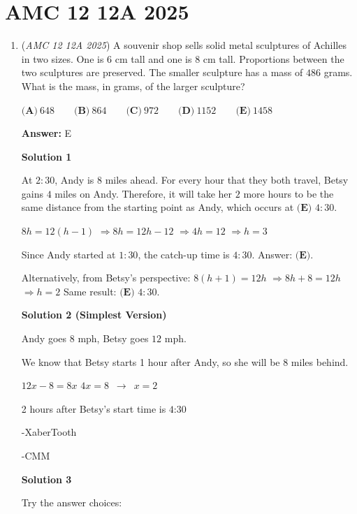 \section{AMC 12 12A 2025}
        \begin{enumerate}
        	\item (\textit{AMC 12 12A 2025}) A souvenir shop sells solid metal sculptures of Achilles in two sizes. One is $6$ cm tall and one is $8$ cm tall. Proportions between the two sculptures are preserved. The smaller sculpture has a mass of $486$ grams. What is the mass, in grams, of the larger sculpture?


 $\textbf{(A)}\   648  \qquad                 \textbf{(B)}\   864  \qquad                 \textbf{(C)}\   972  \qquad                 \textbf{(D)}\   1152  \qquad                 \textbf{(E)}\   1458$

 \textbf{Answer: }E



\textbf{Solution 1}

At $2{:}30$, Andy is $8$ miles ahead. For every hour that they both travel, Betsy gains $4$ miles on Andy. Therefore, it will take her $2$ more hours to be the same distance from the starting point as Andy, which occurs at $\boxed{\textbf{(E) } 4{:}30}$.

 $8h = 12(h-1)$ $\Rightarrow 8h = 12h - 12$ $\Rightarrow 4h = 12$ $\Rightarrow h = 3$

 Since Andy started at $1{:}30$, the catch-up time is $4{:}30$.  Answer: $\textbf{(E)}$.

 Alternatively, from Betsy's perspective:  $8(h+1) = 12h$ $\Rightarrow 8h + 8 = 12h$ $\Rightarrow h = 2$  Same result: $\textbf{(E) } 4{:}30$.

 



\textbf{Solution 2 (Simplest Version)}

Andy goes $8$ mph, Betsy goes $12$ mph.  

 We know that Betsy starts 1 hour after Andy, so she will be 8 miles behind.

 $12x - 8 = 8x$
$4x = 8$ $\,\rightarrow\,$ $x = 2$

 2 hours after Betsy's start time is $\boxed{\text{4:30}}$

 -XaberTooth

 -CMM

 



\textbf{Solution 3}

Try the answer choices:


\end{enumerate}
